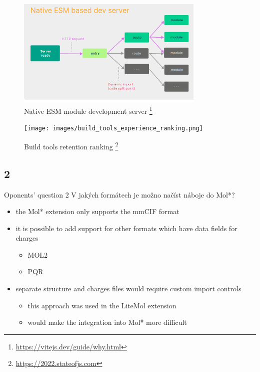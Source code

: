 \documentclass[
]{beamer}
\begin{document}
\begin{frame}
  \begin{figure}
    \includegraphics[width=0.8\textwidth,height=\textheight,keepaspectratio]{images/native_esm_dev_server.png}
    \caption{Native ESM module development server
    \footnote{\url{https://vitejs.dev/guide/why.html}}
  }
  \end{figure}
\end{frame}

\begin{frame}
  \begin{figure}
    \texttt{[image: images/build\_tools\_experience\_ranking.png]}
    \caption{Build tools retention ranking
      \footnote{\url{https://2022.stateofjs.com}}
    }
  \end{figure}
\end{frame}

\subsection[2]{2}

\begin{frame}
  \begin{block}{Oponents' question 2}
    V jakých formátech je možno načíst náboje do Mol*?
  \end{block}
  \begin{itemize}
    \item the Mol* extension only supports the mmCIF format
    \item it is possible to add support for other formats which have data fields for charges
    \begin{itemize}
      \item MOL2
      \item PQR
    \end{itemize}
    \item separate structure and charges files would require custom import controls
    \begin{itemize}
      \item this approach was used in the LiteMol extension
      \item would make the integration into Mol* more difficult
    \end{itemize}
  \end{itemize}
\end{frame}
\end{document}
